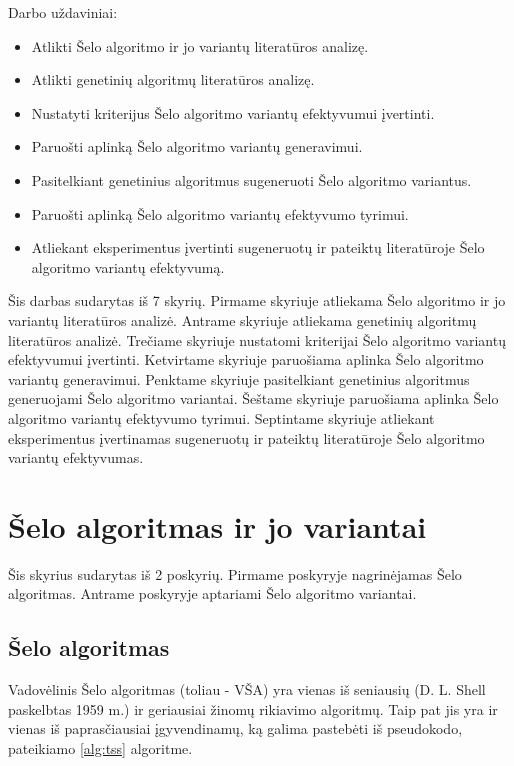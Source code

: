 \documentclass{VUMIFInfKursinis}
\begin{document}
Darbo uždaviniai:
\begin{itemize}
  \item Atlikti Šelo algoritmo ir jo variantų literatūros analizę.
  \item Atlikti genetinių algoritmų literatūros analizę. %
  \item Nustatyti kriterijus Šelo algoritmo variantų efektyvumui įvertinti.
  \item Paruošti aplinką Šelo algoritmo variantų generavimui.
  \item Pasitelkiant genetinius algoritmus sugeneruoti Šelo algoritmo variantus.
  \item Paruošti aplinką Šelo algoritmo variantų efektyvumo tyrimui.
  \item Atliekant eksperimentus įvertinti sugeneruotų ir pateiktų literatūroje Šelo algoritmo variantų efektyvumą.
\end{itemize}

Šis darbas sudarytas iš 7 skyrių.
Pirmame skyriuje atliekama Šelo algoritmo ir jo variantų literatūros analizė.
Antrame skyriuje atliekama genetinių algoritmų literatūros analizė. %
Trečiame skyriuje nustatomi kriterijai Šelo algoritmo variantų efektyvumui įvertinti.
Ketvirtame skyriuje paruošiama aplinka Šelo algoritmo variantų generavimui.
Penktame skyriuje pasitelkiant genetinius algoritmus generuojami Šelo algoritmo variantai.
Šeštame skyriuje paruošiama aplinka Šelo algoritmo variantų efektyvumo tyrimui.
Septintame skyriuje atliekant eksperimentus įvertinamas sugeneruotų ir pateiktų literatūroje Šelo algoritmo variantų efektyvumas.

\section{Šelo algoritmas ir jo variantai}

Šis skyrius sudarytas iš 2 poskyrių.
Pirmame poskyryje nagrinėjamas Šelo algoritmas.
Antrame poskyryje aptariami Šelo algoritmo variantai.

\subsection{Šelo algoritmas}

Vadovėlinis Šelo algoritmas \cite{10.1145/368370.368387} (toliau - VŠA) yra vienas iš seniausių (D. L. Shell paskelbtas 1959 m.) ir geriausiai žinomų rikiavimo algoritmų.
Taip pat jis yra ir vienas iš paprasčiausiai įgyvendinamų,
ką galima pastebėti iš pseudokodo, pateikiamo \ref{alg:tss} algoritme.
\end{document}
